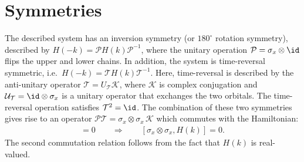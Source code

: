 \section{Symmetries}
The described system has an inversion symmetry (or $180^\circ$ rotation symmetry), described by $H(-k) = \mathcal{P} H(k) \mathcal{P}^{-1}$, where the unitary operation $\mathcal{P} = \sigma_x \otimes \id$ flips the upper and lower chains.
In addition, the system is time-reversal symmetric, i.e.~$H(-k)=\mathcal{T} H(k) \mathcal{T}^{-1}$.
Here, time-reversal is described by the anti-unitary operator $\mathcal{T}=U_\mathcal{T} \mathcal{K}$, where $\mathcal{K}$ is complex conjugation and $\mathcal{U}_\mathcal{T} = \id \otimes \sigma_x$ is a unitary operator that exchanges the two orbitals.
The time-reversal operation satisfies $\mathcal{T}^2 = \id$.
The combination of these two symmetries gives rise to an operator $\mathcal{P}\mathcal{T} = \sigma_x \otimes \sigma_x \, \mathcal{K}$ which commutes with the Hamiltonian:
\begin{align}
    [\mathcal{P}\mathcal{T}, H(k)] = 0\qquad \Rightarrow \qquad [\sigma_x \otimes \sigma_x, H(k)]= 0.
\end{align}
The second commutation relation follows from the fact that $H(k)$ is real-valued.



